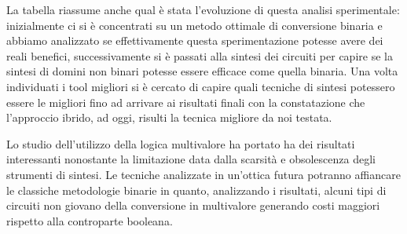 \documentclass[
]{book}
\begin{document}
La tabella riassume anche qual è stata l'evoluzione di questa analisi sperimentale: inizialmente ci si è concentrati su un metodo ottimale di conversione binaria e abbiamo analizzato se effettivamente questa sperimentazione potesse avere dei reali benefici, successivamente si è passati alla sintesi dei circuiti per capire se la sintesi di domini non binari potesse essere efficace come quella binaria. Una volta individuati i tool migliori si è cercato di capire quali tecniche di sintesi potessero essere le migliori fino ad arrivare ai risultati finali con la constatazione che l'approccio ibrido, ad oggi, risulti la tecnica migliore da noi testata.

Lo studio dell'utilizzo della logica multivalore ha portato ha dei risultati interessanti nonostante la limitazione data dalla scarsità e obsolescenza degli strumenti di sintesi. Le tecniche analizzate in un'ottica futura potranno affiancare le classiche metodologie binarie in quanto, analizzando i risultati, alcuni tipi di circuiti non giovano della conversione in multivalore generando costi maggiori rispetto alla controparte booleana.

\newpage

  
\end{document}
